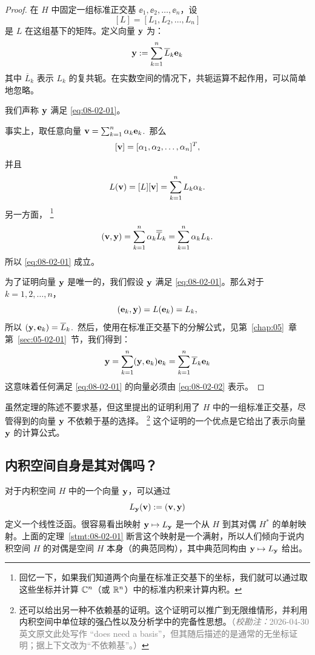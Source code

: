 \begin{proof}
在 $H$ 中固定一组标准正交基 $\ee_1, \ee_2, \dots, \ee_n$，设 $$[L] = [L_1, L_2, \dots, L_n]$$ 是 $L$ 在这组基下的矩阵。定义向量 $\mathbf{y}$ 为：
\begin{equation}\label{eq:08-02-02}
\mathbf{y} := \sum_{k=1}^n \overline{L}_k \mathbf{e}_k
\end{equation}
其中 $\overline{L}_k$ 表示 $L_k$ 的复共轭。在实数空间的情况下，共轭运算不起作用，可以简单地忽略。

我们声称 $\mathbf{y}$ 满足 \eqref{eq:08-02-01}。

事实上，取任意向量 $\mathbf{v} = \sum_{k=1}^n \alpha_k \mathbf{e}_k$.~那么
$$[\mathbf{v}] = [\alpha_1, \alpha_2, \dots, \alpha_n]^T,$$
并且
$$L(\mathbf{v}) = [L][\mathbf{v}] = \sum_{k=1}^n L_k \alpha_k.$$
另一方面，
\footnote{
回忆一下，如果我们知道两个向量在标准正交基下的坐标，我们就可以通过取这些坐标并计算 $\mathbb{C}^n$（或 $\mathbb{R}^n$）中的标准内积来计算内积。}
$$(\mathbf{v}, \mathbf{y}) = \sum_{k=1}^n \alpha_k \overline{\overline{L}}_k = \sum_{k=1}^n \alpha_k L_k.$$
所以 \eqref{eq:08-02-01} 成立。

为了证明向量 $\mathbf{y}$ 是唯一的，我们假设 $\mathbf{y}$ 满足 \eqref{eq:08-02-01}。那么对于 $k = 1, 2, \dots, n$，
$$ (\mathbf{e}_k, \mathbf{y}) = L(\mathbf{e}_k) = L_k ,$$
所以 $(\mathbf{y}, \mathbf{e}_k) = \overline{L}_k$.~然后，使用在标准正交基下的分解公式，见第~\ref{chap:05}~章第~\ref{sec:05-02-01}~节，我们得到：
$$ \mathbf{y} = \sum_{k=1}^n (\mathbf{y}, \mathbf{e}_k) \mathbf{e}_k = \sum_{k=1}^n \overline{L}_k \mathbf{e}_k $$
这意味着任何满足 \eqref{eq:08-02-01} 的向量必须由 \eqref{eq:08-02-02} 表示。\end{proof}

\begin{remark*}
虽然定理的陈述不要求基，但这里提出的证明利用了 $H$ 中的一组标准正交基，尽管得到的向量 $\mathbf{y}$ 不依赖于基的选择。
\footnote{
还可以给出另一种不依赖基的证明。这个证明可以推广到无限维情形，并利用内积空间中单位球的强凸性以及分析学中的完备性思想。\textcolor{gray}{（\textit{校勘注：}2026-04-30 英文原文此处写作 ``does need a basis''，但其随后描述的是通常的无坐标证明；据上下文改为“不依赖基”。）}
}
这个证明的一个优点是它给出了表示向量 $\mathbf{y}$ 的计算公式。
\end{remark*}

\subsection{内积空间自身是其对偶吗？}\label{sec:08-02-02}
对于内积空间 $H$ 中的一个向量 $\mathbf{y}$，可以通过
$$L_{\mathbf{y}}(\mathbf{v}) := (\mathbf{v}, \mathbf{y})$$
定义一个线性泛函。很容易看出映射 $\mathbf{y} \mapsto L_{\mathbf{y}}$ 是一个从 $H$ 到其对偶 $H^*$ 的单射映射。上面的定理~\ref{stmt:08-02-01} 断言这个映射是一个满射，所以人们倾向于说内积空间 $H$ 的对偶是空间 $H$ 本身（的典范同构），其中典范同构由 $\mathbf{y} \mapsto L_{\mathbf{y}}$ 给出。

